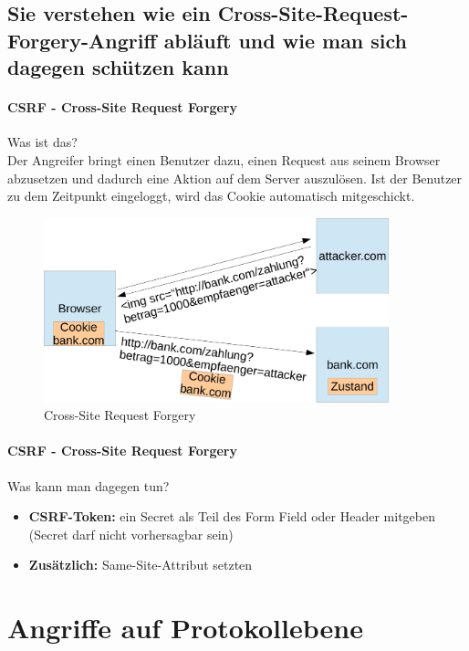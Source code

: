 \documentclass[10pt,a4paper]{article}
\begin{document}
\subsection*{Sie verstehen wie ein Cross-Site-Request-Forgery-Angriff abläuft und wie man sich dagegen schützen kann}

\paragraph*{CSRF - Cross-Site Request Forgery}Was ist das?\\
Der Angreifer bringt einen Benutzer dazu, einen Request aus seinem Browser abzusetzen und  dadurch eine Aktion auf dem Server auszulösen. Ist der Benutzer zu dem Zeitpunkt eingeloggt, wird das Cookie automatisch mitgeschickt.
\begin{figure}[H]
    \begin{center}
    \includegraphics[width=10cm]{images/CSRF.png}
    \caption{Cross-Site Request Forgery}
    \label{CSRF}
    \end{center}
\end{figure}
\paragraph*{CSRF - Cross-Site Request Forgery}Was kann man dagegen tun?
\begin{itemize}[noitemsep,topsep=0pt,leftmargin=*]
    \item \textbf{CSRF-Token:} ein Secret als Teil des Form Field oder Header mitgeben (Secret darf nicht vorhersagbar sein)
    \item \textbf{Zusätzlich:} Same-Site-Attribut setzten
\end{itemize}


\section{Angriffe auf Protokollebene}
\end{document}
